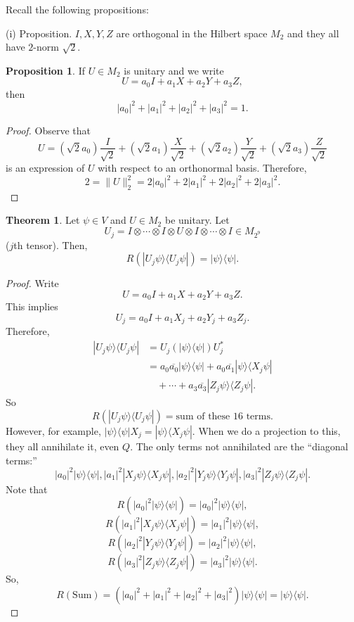 \documentclass[12pt]{article}
\theoremstyle{definition}
\newtheorem*{theorem}{Theorem}
\newtheorem*{proposition}{Proposition}
\begin{document}
Recall the following propositions:

(i) Proposition. $I,X,Y,Z$ are orthogonal in the Hilbert space $M_2$ and they all have $2$-norm $\sqrt{2}$.

\begin{proposition}
If $U \in M_2$ is unitary and we write
\[
U=a_0I+a_1X+a_2Y+a_3Z,
\]
then
\[
|a_0|^2+|a_1|^2+|a_2|^2+|a_3|^2=1.
\]
\end{proposition}

\begin{proof}
Observe that
\[
U=(\sqrt{2}a_0)\frac{I}{\sqrt{2}} + (\sqrt{2}a_1)\frac{X}{\sqrt{2}} + (\sqrt{2}a_2)\frac{Y}{\sqrt{2}} + (\sqrt{2}a_3)\frac{Z}{\sqrt{2}}
\]
is an expression of $U$ with respect to an orthonormal basis. Therefore,
\[
2=\|U\|_2^2 = 2|a_0|^2+2|a_1|^2+2|a_2|^2+2|a_3|^2.
\]
\end{proof}

\begin{theorem}
Let $\psi \in V$ and $U \in M_2$ be unitary. Let
\[
U_j = I \otimes \cdots \otimes I \otimes U \otimes I \otimes \cdots \otimes I \in M_{2^9}
\]
($j$th tensor). Then,
\[
R(|U_j\psi\rangle\langle U_j\psi|)=|\psi\rangle\langle \psi|.
\]
\end{theorem}

\begin{proof}
Write
\[
U=a_0I+a_1X+a_2Y+a_3Z.
\]
This implies
\[
U_j=a_0I+a_1X_j+a_2Y_j+a_3Z_j.
\]
Therefore,
\begin{align*}
|U_j\psi\rangle\langle U_j\psi| &= U_j(|\psi\rangle\langle \psi|)U_j^* \\
&= a_0\overline{a_0}|\psi\rangle\langle \psi| + a_0\overline{a_1}|\psi\rangle\langle X_j\psi| \\
&\quad + \cdots + a_3\overline{a_3}|Z_j\psi\rangle\langle Z_j\psi|.
\end{align*}
So
\[
R(|U_j\psi\rangle\langle U_j\psi|)=\text{sum of these $16$ terms}.
\]
However, for example, $|\psi\rangle\langle \psi|X_j=|\psi\rangle\langle X_j\psi|$. When we do a projection to this,
they all annihilate it, even $Q$. The only terms not annihilated are the ``diagonal terms:''
\[
|a_0|^2|\psi\rangle\langle \psi|, |a_1|^2|X_j\psi\rangle\langle X_j\psi|, |a_2|^2|Y_j\psi\rangle\langle Y_j\psi|, |a_3|^2|Z_j\psi\rangle\langle Z_j\psi|.
\]
Note that
\[
R(|a_0|^2|\psi\rangle\langle \psi|)=|a_0|^2|\psi\rangle\langle \psi|,
\]
\[
R(|a_1|^2|X_j\psi\rangle\langle X_j\psi|)=|a_1|^2|\psi\rangle\langle \psi|,
\]
\[
R(|a_2|^2|Y_j\psi\rangle\langle Y_j\psi|)=|a_2|^2|\psi\rangle\langle \psi|,
\]
\[
R(|a_3|^2|Z_j\psi\rangle\langle Z_j\psi|)=|a_3|^2|\psi\rangle\langle \psi|.
\]
So,
\[
R(\text{Sum})=(|a_0|^2+|a_1|^2+|a_2|^2+|a_3|^2)|\psi\rangle\langle \psi| = |\psi\rangle\langle \psi|.
\]
\end{proof}
\end{document}
